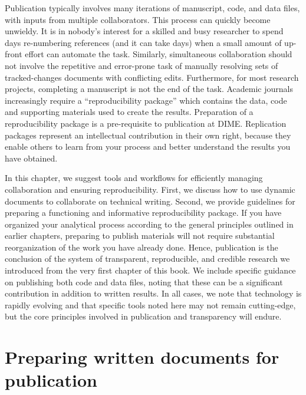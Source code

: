
\begin{fullwidth}
Publication typically involves many iterations of manuscript,
code, and data files, with inputs from multiple collaborators.
This process can quickly become unwieldy.
It is in nobody's interest for a skilled and busy researcher
to spend days re-numbering references (and it can take days)
when a small amount of up-front effort can automate the task.
Similarly, simultaneous collaboration should not involve
the repetitive and error-prone task of manually resolving
sets of tracked-changes documents with conflicting edits.
Furthermore, for most research projects,
completing a manuscript is not the end of the task.
Academic journals increasingly require a ``reproducibility package''
which contains the data, code and supporting materials used to create the results.
Preparation of a reproducibility package is a pre-requisite to publication at DIME.
Replication packages represent an intellectual contribution in their own right,
because they enable others to learn from your process
and better understand the results you have obtained.

In this chapter, we suggest tools and workflows for efficiently managing collaboration
and ensuring reproducibility.
First, we discuss how to use dynamic documents to collaborate on technical writing.
Second, we provide guidelines for preparing a functioning and informative reproducibility package.
If you have organized your analytical process
according to the general principles outlined in earlier chapters,
preparing to publish materials will not require
substantial reorganization of the work you have already done.
Hence, publication is the conclusion of the system
of transparent, reproducible, and credible research we introduced
from the very first chapter of this book.
We include specific guidance on publishing both code and data files,
noting that these can be a significant contribution in addition to written results.
In all cases, we note that technology is rapidly evolving
and that specific tools noted here may not remain cutting-edge,
but the core principles involved in publication and transparency will endure.
\end{fullwidth}


\section{Preparing written documents for publication}

